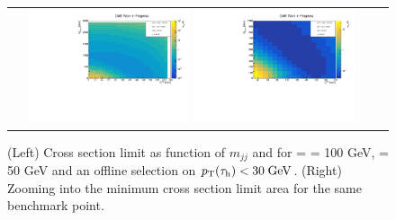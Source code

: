 \begin{figure}[tbh!]
	\centering
	\begin{tabular}{cc}
		\includegraphics[width=0.45\textwidth]{analysis/pics/JetInvMass_vs_MET_xsec_chi100_lsp050_taupt30.pdf}
		\includegraphics[width=0.45\textwidth]{analysis/pics/JetInvMass_vs_MET_xsec_chi100_lsp050_taupt30_zoom.pdf}
	\end{tabular}
	\caption{(Left) Cross section limit as function of $m_{jj}$ and \met for \charginopm = \neutralinotwo = 100 GeV, \neutralinoone = 50 GeV and an offline selection on $p_{\text{T}}(\tau_{\text{h}}) <  30\;\text{Ge}\kern-0.06667em\text{V}$. (Right) Zooming into the minimum cross section limit area for the same benchmark point.}
	\label{fig::JetInvMass_vs_MET_xsec_chi100_lsp050_taupt30}
\end{figure}

